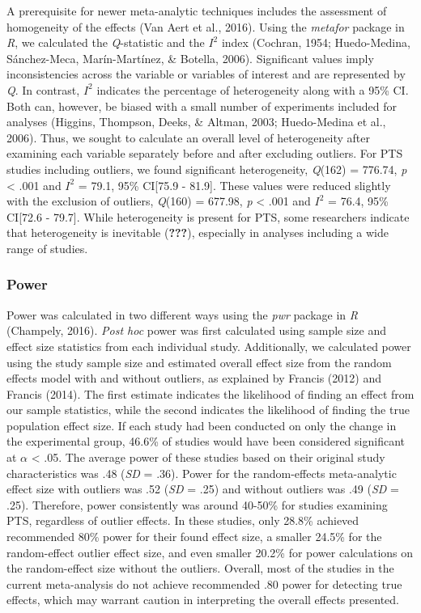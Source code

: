 \documentclass[man]{apa6}
\theoremstyle{definition}
\theoremstyle{definition}
\theoremstyle{definition}
\theoremstyle{remark}
\begin{document}
A prerequisite for newer meta-analytic techniques includes the
assessment of homogeneity of the effects (Van Aert et al., 2016). Using
the \emph{metafor} package in \emph{R}, we calculated the
\emph{Q}-statistic and the \(I^2\) index (Cochran, 1954; Huedo-Medina,
Sánchez-Meca, Marín-Martínez, \& Botella, 2006). Significant values
imply inconsistencies across the variable or variables of interest and
are represented by \emph{Q}. In contrast, \(I^2\) indicates the
percentage of heterogeneity along with a 95\% CI. Both can, however, be
biased with a small number of experiments included for analyses
(Higgins, Thompson, Deeks, \& Altman, 2003; Huedo-Medina et al., 2006).
Thus, we sought to calculate an overall level of heterogeneity after
examining each variable separately before and after excluding outliers.
For PTS studies including outliers, we found significant heterogeneity,
\emph{Q}(162) = 776.74, \emph{p} \textless{} .001 and \(I^2\) = 79.1,
95\% CI{[}75.9 - 81.9{]}. These values were reduced slightly with the
exclusion of outliers, \emph{Q}(160) = 677.98, \emph{p} \textless{} .001
and \(I^2\) = 76.4, 95\% CI{[}72.6 - 79.7{]}. While heterogeneity is
present for PTS, some researchers indicate that heterogeneity is
inevitable ({\textbf{???}}), especially in analyses including a wide
range of studies.

\subsubsection{Power}\label{power}

Power was calculated in two different ways using the \emph{pwr} package
in \emph{R} (Champely, 2016). \emph{Post hoc} power was first calculated
using sample size and effect size statistics from each individual study.
Additionally, we calculated power using the study sample size and
estimated overall effect size from the random effects model with and
without outliers, as explained by Francis (2012) and Francis (2014). The
first estimate indicates the likelihood of finding an effect from our
sample statistics, while the second indicates the likelihood of finding
the true population effect size. If each study had been conducted on
only the change in the experimental group, 46.6\% of studies would have
been considered significant at \(\alpha\) \textless{} .05. The average
power of these studies based on their original study characteristics was
.48 (\emph{SD} = .36). Power for the random-effects meta-analytic effect
size with outliers was .52 (\emph{SD} = .25) and without outliers was
.49 (\emph{SD} = .25). Therefore, power consistently was around 40-50\%
for studies examining PTS, regardless of outlier effects. In these
studies, only 28.8\% achieved recommended 80\% power for their found
effect size, a smaller 24.5\% for the random-effect outlier effect size,
and even smaller 20.2\% for power calculations on the random-effect size
without the outliers. Overall, most of the studies in the current
meta-analysis do not achieve recommended .80 power for detecting true
effects, which may warrant caution in interpreting the overall effects
presented.
\end{document}
